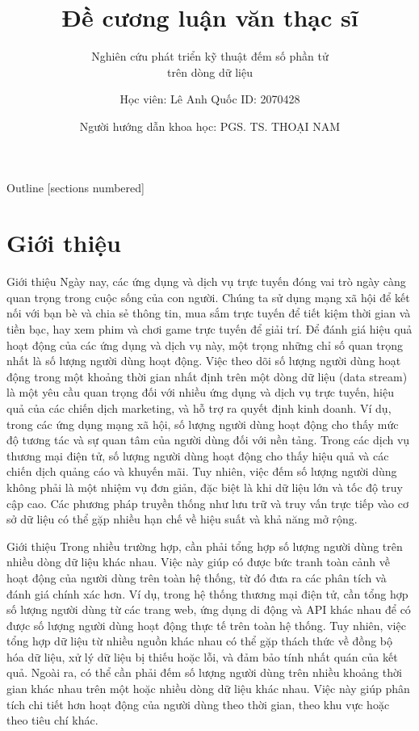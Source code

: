 \documentclass[10pt]{beamer}
\title{Đề cương luận văn thạc sĩ}
\subtitle{Nghiên cứu phát triển kỹ thuật đếm số phần tử \\ \hspace{2.4cm} trên dòng dữ liệu}
\date{Người hướng dẫn khoa học: \hspace{0.5cm}PGS. TS. THOẠI NAM}
\author{Học viên: Lê Anh Quốc \hspace{1cm} ID: 2070428}
\begin{document}
\maketitle

\begin{frame}{Outline}
  [sections numbered]
  \tableofcontents[hideallsubsections]
\end{frame}

\section{Giới thiệu}

\begin{frame}[fragile]{Giới thiệu}
Ngày nay, các ứng dụng và dịch vụ trực tuyến đóng vai trò ngày càng quan trọng trong cuộc sống của
con người. Chúng ta sử dụng mạng xã hội để kết nối với bạn bè và chia sẻ thông tin, mua sắm trực tuyến
để tiết kiệm thời gian và tiền bạc, hay xem phim và chơi game trực tuyến để giải trí. Để đánh giá hiệu quả
hoạt động của các ứng dụng và dịch vụ này, một trọng những chỉ số quan trọng nhất là số lượng người dùng
hoạt động.
Việc theo dõi số lượng người dùng hoạt động trong một khoảng thời gian nhất định trên một dòng dữ
liệu (data stream) là một yêu cầu quan trọng đối với nhiều ứng dụng và dịch vụ trực tuyến, hiệu quả của
các chiến dịch marketing, và hỗ trợ ra quyết định kinh doanh.
Ví dụ, trong các ứng dụng mạng xã hội, số lượng người dùng hoạt động cho thấy mức độ tương tác và sự
quan tâm của người dùng đối với nền tảng. Trong các dịch vụ thương mại điện tử, số lượng người dùng hoạt
động cho thấy hiệu quả và các chiến dịch quảng cáo và khuyến mãi.
Tuy nhiên, việc đếm số lượng người dùng không phải là một nhiệm vụ đơn giản, đặc biệt là khi dữ liệu lớn
và tốc độ truy cập cao. Các phương pháp truyền thống như lưu trữ và truy vấn trực tiếp vào cơ sở dữ liệu
có thể gặp nhiều hạn chế về hiệu suất và khả năng mở rộng.
\end{frame}
\begin{frame}[fragile]{Giới thiệu}
  Trong nhiều trường hợp, cần phải tổng hợp số lượng người dùng trên nhiều dòng dữ liệu khác nhau. Việc
này giúp có được bức tranh toàn cảnh về hoạt động của người dùng trên toàn hệ thống, từ đó đưa ra các
phân tích và đánh giá chính xác hơn.
Ví dụ, trong hệ thống thương mại điện tử, cần tổng hợp số lượng người dùng từ các trang web, ứng dụng di
động và API khác nhau để có được số lượng người dùng hoạt động thực tế trên toàn hệ thống. Tuy nhiên,
việc tổng hợp dữ liệu từ nhiều nguồn khác nhau có thể gặp thách thức về đồng bộ hóa dữ liệu, xử lý dữ liệu
bị thiếu hoặc lỗi, và đảm bảo tính nhất quán của kết quả.
Ngoài ra, có thể cần phải đếm số lượng người dùng trên nhiều khoảng thời gian khác nhau trên một hoặc
nhiều dòng dữ liệu khác nhau. Việc này giúp phân tích chi tiết hơn hoạt động của người dùng theo thời gian,
theo khu vực hoặc theo tiêu chí khác.
\end{frame}
\end{document}
